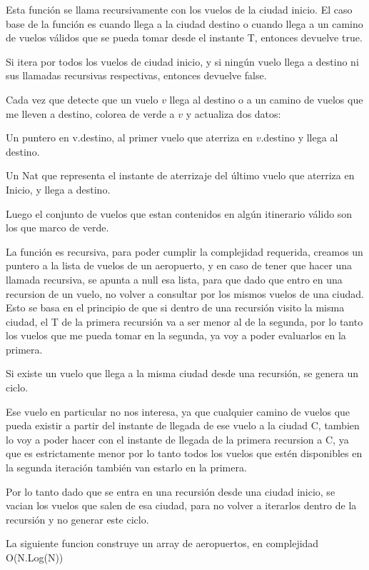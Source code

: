 Esta funci\'on se llama recursivamente con los vuelos de la ciudad inicio. El caso base de la funci\'on es cuando llega a la ciudad destino o cuando llega a un camino de vuelos v\'alidos que se pueda tomar desde el instante T, entonces devuelve true.

Si itera por todos los vuelos de ciudad inicio, y si ning\'un vuelo llega a destino ni sus llamadas recursivas respectivas, entonces devuelve false.

Cada vez que detecte que un vuelo $v$ llega al destino o a un camino de vuelos que me lleven a destino, colorea de verde a $v$ y actualiza dos datos:

Un puntero en v.destino, al primer vuelo que aterriza en $v$.destino y llega al destino.

Un Nat que representa el instante de aterrizaje del \'ultimo vuelo que aterriza en Inicio, y llega a destino.

Luego el conjunto de vuelos que estan contenidos en alg\'un itinerario v\'alido son los que marco de verde.

La funci\'on es recursiva, para poder cumplir la complejidad requerida, creamos un puntero a la lista de vuelos de un aeropuerto, y en caso de tener que hacer una llamada recursiva, se apunta a null esa lista, para que dado que entro en una recursion de un vuelo, no volver a consultar por los mismos vuelos de una ciudad. Esto se basa en el principio de que si dentro de una recursi\'on visito la misma ciudad, el T de la primera recursi\'on va a ser menor al de la segunda, por lo tanto los vuelos que me pueda tomar en la segunda, ya voy a poder evaluarlos en la primera.

Si existe un vuelo que llega a la misma ciudad desde una recursi\'on, se genera un ciclo.

Ese vuelo en particular no nos interesa, ya que cualquier camino de vuelos que pueda existir a partir del instante de llegada de ese vuelo a la ciudad C, tambien lo voy a poder hacer con el instante de llegada de la primera recursion a C, ya que es estrictamente menor por lo tanto todos los vuelos que est\'en disponibles en la segunda iteraci\'on tambi\'en van estarlo en la primera. 

Por lo tanto dado que se entra en una recursi\'on desde una ciudad inicio, se vacian los vuelos que salen de esa ciudad, para no volver a iterarlos dentro de la recursi\'on y no generar este ciclo.

La siguiente funcion construye un array de aeropuertos, en complejidad O(N.Log(N))

